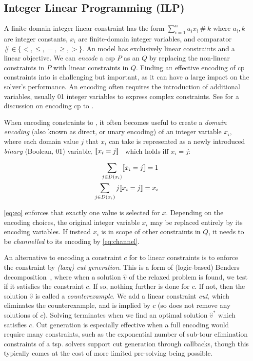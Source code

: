 \documentclass[a4paper,UKenglish,cleveref,autoref,thm-restate]{lipics-v2021}
\begin{document}
\subsection{Integer Linear Programming (ILP)}
\label{sec:background:ilp}

A finite-domain integer linear constraint has the form $\sum_{i=1}^n a_{i} x_{i}\ \#\ k$ where $a_{i}, k$ are integer constants, $x_{i}$ are finite-domain integer variables, and comparator $\# \in \{ <, \leq, =, \geq, > \}$.
An \milp model has exclusively linear constraints and a linear objective.
We can \textit{encode} a \gls{csp} $P$ as an \milp $Q$ by replacing the non-linear constraints in $P$ with linear constraints in $Q$. 
Finding an effective encoding of \gls{cp} constraints into \milp{} is challenging but important, as it can have a large impact on the solver's performance.
An encoding often requires the introduction of additional variables, usually 01 integer variables to express complex constraints.
See  for a discussion on encoding \gls{cp} to \milp. 

When encoding constraints to \milp, it often becomes useful to create a \textit{domain encoding} (also known as direct, or unary encoding) of an integer variable $x_i$, where each domain value $j$ that $x_i$ can take is represented as a newly introduced \textit{binary} (Boolean, 01) variable, $[\![x_i = j]\!]$~\cite{refalo_linear_2000} which holds iff $x_i = j$:

\begin{subequations}
    \label{eq:domain}
    \begin{align}
        \sum_{j \in D(x_i)} [\![x_i = j]\!] = 1 \label{eq:eo} \\
        \sum_{j \in D(x_i)} j [\![x_i = j]\!] = x_i \label{eq:channel} 
    \end{align}
\end{subequations}

\cref{eq:eo} enforces that exactly one value is selected for $x$.
Depending on the encoding choices, the original integer variable $x_i$ may be replaced entirely by its encoding variables.
If instead $x_i$ is in scope of other constraints in $Q$, it needs to be \textit{channelled} to its encoding by \cref{eq:channel}.


An alternative to encoding a constraint $c$ for \milp{} to linear constraints is to enforce the constraint by \emph{(lazy) cut generation}. 
This is a form of (logic-based) Benders decomposition~\cite{DBLP:journals/ior/Hooker07}, where when a solution $\hat{v}$ of the relaxed problem is found, 
we test if it satisfies the constraint $c$.
If so, nothing further is done for $c$.
If not, then the solution $\hat{v}$ is called a \textit{counterexample}.
We add a linear constraint \emph{cut}, which eliminates the counterexample, and is implied by $c$ (so does not remove any solutions of $c$). 
Solving terminates when we find an optimal solution $\hat{v}^{*}$ which satisfies $c$.
Cut generation is especially effective when a full encoding would require many constraints, such as the exponential number of sub-tour elimination constraints of a \gls{tsp}.
\milp{} solvers support cut generation through callbacks, though this typically comes at the cost of more limited pre-solving being possible. 
\end{document}
